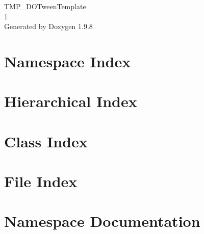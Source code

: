 \documentclass[twoside]{book}
\newcommand{\+}{\discretionary{\mbox{\scriptsize$\hookleftarrow$}}{}{}}
\newcommand{\clearemptydoublepage}{%
    \newpage{\pagestyle{empty}\cleardoublepage}%
  }
\begin{document}
  \raggedbottom
    \hypersetup{pageanchor=false,
                bookmarksnumbered=true,
                pdfencoding=unicode
               }
  \begin{titlepage}
  \vspace*{7cm}
  \begin{center}%
  {\Large TMP\+\_\+\+DOTween\+Template}\\
  [1ex]\large 1 \\
  \vspace*{1cm}
  {\large Generated by Doxygen 1.9.8}\\
  \end{center}
  \end{titlepage}
  \clearemptydoublepage
  \tableofcontents
  \clearemptydoublepage
  \hypersetup{pageanchor=true}
\chapter{Namespace Index}

\chapter{Hierarchical Index}

\chapter{Class Index}

\chapter{File Index}

\chapter{Namespace Documentation}











\end{document}
